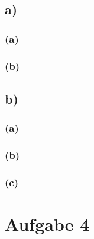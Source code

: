 \documentclass[a4paper, 11pt]{article}
\begin{document}
\subsection{a)}
\label{sec:org8365333}
\subsubsection{(a)}
\label{sec:org629d593}
\subsubsection{(b)}
\label{sec:org0efba22}
\subsection{b)}
\label{sec:org99b6063}
\subsubsection{(a)}
\label{sec:org4a6de2e}
\subsubsection{(b)}
\label{sec:org8f877d8}
\subsubsection{(c)}
\label{sec:org2284fe0}
\section{Aufgabe 4}
\label{sec:org3887b6e}
\end{document}
